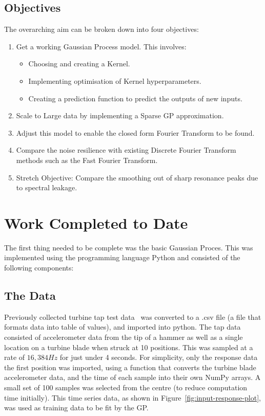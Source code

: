\documentclass[12pt]{article}
\begin{document}
    \subsection{Objectives}
    The overarching aim can be broken down into four objectives:
        \begin{enumerate}
            \item Get a working Gaussian Process model.
            This involves:
                \begin{itemize}
                    \item Choosing and creating a Kernel.
                    \item Implementing optimisation of Kernel hyperparameters. \label{item:nll}
                    \item Creating a prediction function to predict the outputs of new inputs. \label{item:predict}
                \end{itemize}
            \item Scale to Large data by implementing a Sparse GP approximation.
            \item Adjust this model to enable the closed form Fourier Transform to be found.
            \item Compare the noise resilience with existing Discrete Fourier Transform methods such as the Fast Fourier Transform.\label{noise-resiliance}
            \item Stretch Objective: Compare the smoothing out of sharp resonance peaks due to spectral leakage.\label{stretch-obj}
        \end{enumerate}

    \section{Work Completed to Date}
    The first thing needed to be complete was the basic Gaussian Proces.
    This was implemented using the programming language Python and consisted of the following components:
    \subsection{The Data}
    Previously collected turbine tap test data~\cite{MEC326} was converted to a .csv file (a file that formats data into table of values), and imported into python.
    The tap data consisted of accelerometer data from the tip of a hammer as well as a single location on a turbine blade when struck at 10 positions.
    This was sampled at a rate of $16,384 Hz$ for just under 4 seconds.
    For simplicity, only the response data the first position was imported, using a function that converts the turbine blade accelerometer data, and the time of each sample into their own NumPy arrays.
    A small set of 100 samples was selected from the centre (to reduce computation time initially).
    This time series data, as shown in Figure~\ref{fig:input-response-plot}, was used as training data to be fit by the GP.
\end{document}
